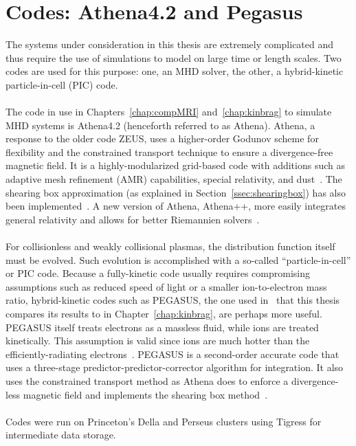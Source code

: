 \section{Codes: Athena4.2 and Pegasus} \label{sec:codes}
The systems under consideration in this thesis are extremely complicated and thus require the use of simulations to model on large time or length scales. Two codes are used for this purpose: one, an MHD solver, the other, a hybrid-kinetic particle-in-cell (PIC) code.\\
\\
The code in use in Chapters~\ref{chap:compMRI} and~\ref{chap:kinbrag} to simulate MHD systems is Athena4.2 (henceforth referred to as Athena). Athena, a response to the older code ZEUS, uses a higher-order Godunov scheme for flexibility and the constrained transport technique to ensure a divergence-free magnetic field. It is a highly-modularized grid-based code with additions such as adaptive mesh refinement (AMR) capabilities, special relativity, and dust~\cite{Stone2008,Stone2009}. The shearing box approximation (as explained in Section~\ref{ssec:shearingbox}) has also been implemented~\cite{Stone2010}. A new version of Athena, Athena++, more easily integrates general relativity and allows for better Riemannien solvers~\cite{White2016Thesis,White2016}.\\
\\
For collisionless and weakly collisional plasmas, the distribution function itself must be evolved. Such evolution is accomplished with a so-called ``particle-in-cell'' or PIC code. Because a fully-kinetic code usually requires compromising assumptions such as reduced speed of light or a smaller ion-to-electron mass ratio, hybrid-kinetic codes such as PEGASUS, the one used in~ that this thesis compares its results to in Chapter~\ref{chap:kinbrag}, are perhaps more useful. PEGASUS itself treats electrons as a massless fluid, while ions are treated kinetically. This assumption is valid since ions are much hotter than the efficiently-radiating electrons~\cite{Das2013}. PEGASUS is a second-order accurate code that uses a three-stage predictor-predictor-corrector algorithm for integration. It also uses the constrained transport method as Athena does to enforce a divergence-less magnetic field and implements the shearing box method~\cite{Kunz2014}. \\
\\
Codes were run on Princeton's Della and Perseus clusters using Tigress for intermediate data storage.

